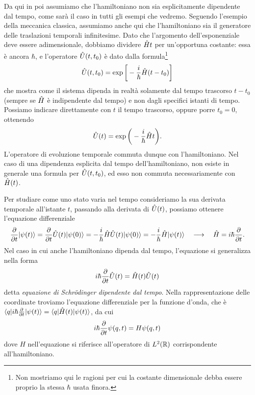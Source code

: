 Da qui in poi assumiamo che l'hamiltoniano non sia esplicitamente dipendente dal tempo, come sarà il caso in tutti gli esempi che vedremo.
Seguendo l'esempio della meccanica classica, assumiamo anche qui che l'hamiltoniano sia il generatore delle traslazioni temporali infinitesime.
Dato che l'argomento dell'esponenziale deve essere adimensionale, dobbiamo dividere $\op Ht$ per un'opportuna costante: essa è ancora $\hbar$, e l'operatore $\op U(t,t_0)$ è dato dalla formula\footnote{Non mostriamo qui le ragioni per cui la costante dimensionale debba essere proprio la stessa $\hbar$ usata finora.}
\begin{equation}
	\op U(t,t_0)=\exp\bigg[-\frac{i}{\hbar}\op H(t-t_0)\bigg]
	\label{eq:operatore-evoluzione-temporale}
\end{equation}
che mostra come il sistema dipenda in realtà solamente dal tempo trascorso $t-t_0$ (sempre se $\op H$ è indipendente dal tempo) e non dagli specifici istanti di tempo.
Possiamo indicare direttamente con $t$ il tempo trascorso, oppure porre $t_0=0$, ottenendo
\begin{equation}
	\op U(t)=\exp\bigg(-\frac{i}{\hbar}\op Ht\bigg).
\end{equation}
L'operatore di evoluzione temporale commuta dunque con l'hamiltoniano.
Nel caso di una dipendenza esplicita dal tempo dell'hamiltoniano, non esiste in generale una formula per $\op U(t,t_0)$, ed esso non commuta necessariamente con $\op H(t)$.

Per studiare come uno stato varia nel tempo consideriamo la sua derivata temporale all'istante $t$, passando alla derivata di $\op U(t)$, possiamo ottenere l'equazione differenziale
\begin{equation}
	\drp{}{t}\ket{\psi(t)}=\drp{}{t}\op U(t)\ket{\psi(0)}=-\frac{i}{\hbar}\op H\op U(t)\ket{\psi(0)}=-\frac{i}{\hbar}\op H\ket{\psi(t)}\quad\longrightarrow\quad \op H=i\hbar\drp{}{t}.
\end{equation}
Nel caso in cui anche l'hamiltoniano dipenda dal tempo, l'equazione si generalizza nella forma
\begin{equation}
	i\hbar\drp{}{t}\op U(t)=\op H(t)\op U(t)
	\label{eq:schrodinger-tempo}
\end{equation}
detta \emph{equazione di Schr\"odinger dipendente dal tempo}.
Nella rappresentazione delle coordinate troviamo l'equazione differenziale per la funzione d'onda, che è $\bra{q}i\hbar\drp{}{t}\ket{\psi(t)}=\bra{q}\op H(t)\ket{\psi(t)}$, da cui
\begin{equation}
	i\hbar\drp{}{t}\psi(q,t)=H\psi(q,t)
	\label{eq:schrodinger-tempo-coordinate}
\end{equation}
dove $H$ nell'equazione si riferisce all'operatore di $\leb[2]{\R}$ corrispondente all'hamiltoniano.

